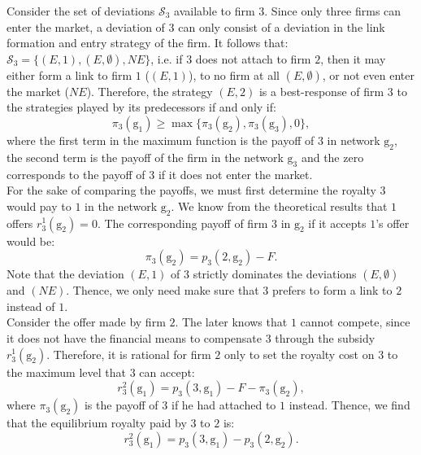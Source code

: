 \documentclass{article}
\begin{document}
Consider the set of deviations $\mathcal{S}_3$ available to firm $3$. Since only three firms can enter the market, a deviation of $3$ can only consist of a deviation in the link formation and entry strategy of the firm. It follows that: $\mathcal{S}_3=\{(E,1),(E,\emptyset), NE\}$, i.e. if $3$ does not attach to firm $2$, then it may either form a link to firm $1$ ($(E,1)$), to no firm at all $(E,\emptyset)$, or not even enter the market ($NE$). Therefore, the strategy $(E,2)$ is a best-response of firm $3$ to the strategies played by its predecessors if and only if: 
\begin{equation*}
    \pi_3(\text{g}_1)\geq \max\{\pi_3(\text{g}_2), \pi_3(\text{g}_3), 0\},
\end{equation*}
where the first term in the maximum function is the payoff of $3$ in network $\text{g}_2$, the second term is the payoff of the firm in the network $\text{g}_3$ and the zero corresponds to the payoff of $3$ if it does not enter the market. \\
\indent For the sake of comparing the payoffs, we must first determine the royalty $3$ would pay to $1$ in the network $\text{g}_2$. We know from the theoretical results that $1$ offers $r^1_3(\text{g}_2)=0$. The corresponding payoff of firm $3$ in $\text{g}_2$ if it accepts $1$'s offer would  be: 
\begin{equation}
    \pi_3(\text{g}_2)= p_3(2,\text{g}_2)  -F. 
\end{equation}
Note that the deviation $(E,1)$ of $3$ strictly dominates the deviations $(E,\emptyset)$ and $(NE)$. Thence, we only need make sure that $3$ prefers to form a link to $2$ instead of $1$. \\
\indent Consider the offer made by firm $2$. The later knows that $1$ cannot compete, since it does not have the financial means to compensate $3$ through the subsidy $r^1_3(\text{g}_2)$. Therefore, it is rational for firm $2$ only to set the royalty cost on $3$ to the maximum level that $3$ can accept: 
\begin{equation*}
    r^2_3(\text{g}_1)= p_3(3,\text{g}_1)-F-\pi_3(\text{g}_2), 
\end{equation*}
where $\pi_3(\text{g}_2)$ is the payoff of $3$ if he had attached to $1$ instead. Thence, we find that the equilibrium royalty paid by $3$ to $2$ is: 
\begin{equation}
    r^2_3(\text{g}_1)= p_3(3,\text{g}_1)-p_3(2,\text{g}_2). \label{r23}
\end{equation}
\end{document}
